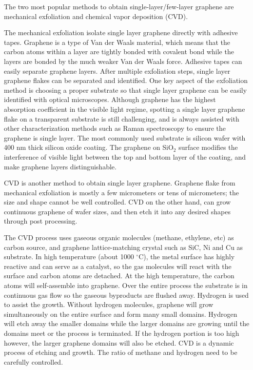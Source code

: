 \documentclass[pdflatex, sectionletters, 12pt]{pittetd}    %
\begin{document}
The two most popular methods to obtain single-layer/few-layer graphene are mechanical exfoliation and chemical vapor deposition (CVD). 

The mechanical exfoliation isolate single layer graphene directly with adhesive tapes. Graphene is a type of Van der Waals material, which means that the carbon atoms within a layer are tightly bonded with covalent bond while the layers are bonded by the much weaker Van der Waals force. Adhesive tapes can easily separate graphene layers. After multiple exfoliation steps, single layer graphene flakes can be separated and identified\cite{}. One key aspect of the exfoliation method is choosing a proper substrate so that single layer graphene can be easily identified with optical microscopes. Although graphene has the highest absorption coefficient in the visible light regime\cite{}, spotting a single layer graphene flake on a transparent substrate is still challenging, and is always assisted with other characterization methods such as Raman spectroscopy\cite{} to ensure the graphene is single layer. The most commonly used substrate is silicon wafer with 400 nm thick silicon oxide coating. The graphene on SiO$_2$ surface modifies the interference of visible light between the top and bottom layer of the coating, and make graphene layers distinguishable\cite{}. 

CVD is another method to obtain single layer graphene. Graphene flake from mechanical exfoliation is mostly a few micrometers or tens of micrometers; the size and shape cannot be well controlled. CVD on the other hand, can grow continuous graphene of wafer sizes\cite{}, and then etch it into any desired shapes through post processing. 

The CVD process uses gaseous organic molecules (methane, ethylene, etc) as carbon source, and graphene lattice-matching crystal such as SiC, Ni and Cu as substrate. In high temperature (about 1000 $^{\circ}$C), the metal surface has highly reactive and can serve as a catalyst, so the gas molecules will react with the surface and carbon atoms are detached. At the high temperature, the carbon atoms will self-assemble into graphene. Over the entire process the substrate is in continuous gas flow so the gaseous byproducts are flushed away. Hydrogen is used to assist the growth. Without hydrogen molecules, graphene will grow simultaneously on the entire surface and form many small domains. Hydrogen will etch away the smaller domains while the larger domains are growing\cite{} until the domains meet or the process is terminated. If the hydrogen portion is too high however, the larger graphene domains will also be etched. CVD is a dynamic process of etching and growth. The ratio of methane and hydrogen need to be carefully controlled.
\end{document}
